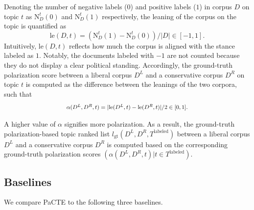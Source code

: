 \documentclass[11pt]{article}
\newcommand{\notenm}[1]{{\color{magenta} [{\sffamily\bfseries NOTE Negar:} {\em #1}]}}
\begin{document}
Denoting the number of negative labels ($0$) and positive labels ($1$) in corpus $D$ on topic $t$ as $\text{N}_D^{t}(0)$ and $\text{N}_D^{t}(1)$ respectively,
the leaning of the corpus on the topic is quantified as 
\begin{equation}
    \text{le}(D, t) = (\text{N}_D^{t}(1) - \text{N}_D^{t}(0))/|D| \in [-1,1].
\end{equation}
Intuitively, $\text{le}(D,t)$ reflects how much the corpus is aligned with the stance labeled as $1$. Notably, the documents labeled with $-1$ are not counted because they do not display a clear political standing.
Accordingly, the ground-truth %
polarization score between a liberal corpus $D^L$ and a conservative corpus $D^R$ on topic $t$ is computed as the difference %
between the leanings of the two corpora, such that
\begin{equation}
 \scalebox{0.85}{$\alpha(D^L,D^R,t) = |\text{le}(D^L, t)-\text{le}(D^R, t)|/2 \in [0,1].$} 
\end{equation}

A higher value of $\alpha$ signifies more polarization. As a result, the ground-truth polarization-based topic ranked list $l_{\text{gt}}(D^L, D^R, T^{\text{labeled}})$ between a liberal corpus $D^L$ and a conservative corpus $D^R$ is computed based on the corresponding ground-truth polarization scores $( \alpha(D^L, D^R, t)  | t \in T^{\text{labeled}} )$. 


\subsection{Baselines}
We compare PaCTE to the following three baselines.
\end{document}
